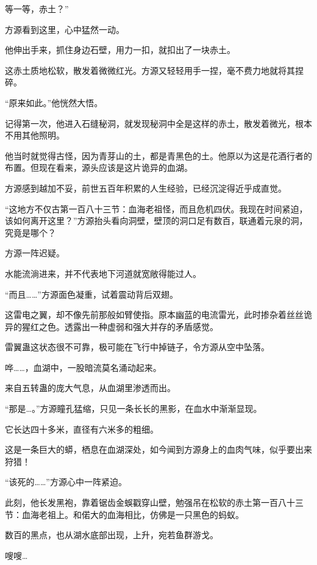 
\begin{this_body}

等一等，赤土？”

方源看到这里，心中猛然一动。

他伸出手来，抓住身边石壁，用力一扣，就扣出了一块赤土。

这赤土质地松软，散发着微微红光。方源又轻轻用手一捏，毫不费力地就将其捏碎。

“原来如此。”他恍然大悟。

记得第一次，他进入石缝秘洞，就发现秘洞中全是这样的赤土，散发着微光，根本不用其他照明。

他当时就觉得古怪，因为青芽山的土，都是青黑色的土。他原以为这是花酒行者的布置。但现在看来，源头应该是这片诡异的血湖。

方源感到越加不妥，前世五百年积累的人生经验，已经沉淀得近乎成直觉。

“这地方不仅古第一百八十三节：血海老祖怪，而且危机四伏。我现在时间紧迫，该如何离开这里？”方源抬头看向洞壁，壁顶的洞口足有数百，联通着元泉的洞，究竟是哪个？

方源一阵迟疑。

水能流淌进来，并不代表地下河道就宽敞得能过人。

“而且……”方源面色凝重，试着震动背后双翅。

这雷电之翼，却不像先前那般如臂使指。原本幽蓝的电流雷光，此时掺杂着丝丝诡异的猩红之色。透露出一种虚弱和强大并存的矛盾感觉。

雷翼蛊这状态很不可靠，极可能在飞行中掉链子，令方源从空中坠落。

哗……，血湖中，一股暗流莫名涌动起来。

来自五转蛊的庞大气息，从血湖里渗透而出。

“那是…。”方源瞳孔猛缩，只见一条长长的黑影，在血水中渐渐显现。

它长达四十多米，直径有六米多的粗细。

这是一条巨大的蟒，栖息在血湖深处，如今闻到方源身上的血肉气味，似乎要出来狩猎！

“该死的……”方源心中一阵紧迫。

此刻，他长发黑袍，靠着锯齿金蜈戳穿山壁，勉强吊在松软的赤土第一百八十三节：血海老祖上。和偌大的血海相比，仿佛是一只黑色的蚂蚁。

数百的黑点，也从湖水底部出现，上升，宛若鱼群游戈。

嗖嗖…


\end{this_body}
